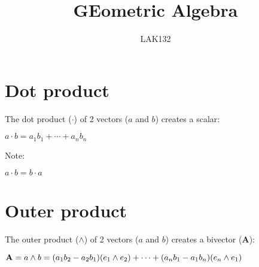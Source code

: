 \documentclass[14pt]{extarticle}
\title{GEometric Algebra}
\author{LAK132}
\begin{document}
\color{white}
\pagecolor{black!90}

\setlength{\parindent}{0pt}
\setlength{\parskip}{6pt}

\maketitle

\pagebreak
\tableofcontents

%
%

\pagebreak
\section{Dot product}
\label{sec:dot-product}

The dot product (\(\cdot\)) of 2 vectors (\(a\) and \(b\))
creates a scalar:

\newcommand{\dotpart}[4]{ #1_#2 #3_#4 }

\newcommand{\expdot}[3][]{
  #1 \dotpart{#2}{1}{#3}{1} + \cdots + #1 \dotpart{#2}{n}{#3}{n}}

\( a \cdot b = \expdot{a}{b} \)

Note:

\( a \cdot b = b \cdot a \)

%
%

\pagebreak
\section{Outer product}
\label{sec:outer-product}

The outer product (\(\wedge\)) of 2 vectors (\(a\) and \(b\))
creates a bivector (\(\mathbf{A}\)):

\newcommand{\wedgepart}[4]{(#1_#2 #3_#4 - #1_#4 #3_#2) (e_#2 \wedge e_#4)}

\newcommand{\expwedge}[2]{
  \wedgepart{#1}{1}{#2}{2} + \cdots + \wedgepart{#1}{n}{#2}{1}}

\newcommand{\expwedgepre}[3]{
  #1 \wedgepart{#2}{1}{#3}{2} + \cdots + #1 \wedgepart{#2}{n}{#3}{1}}

\newcommand{\expwedgepost}[3]{
  \wedgepart{#1}{1}{#2}{2} #3 + \cdots + \wedgepart{#1}{n}{#2}{1} #3}

\newcommand{\expwedgeprepost}[4]{
  #1 \wedgepart{#2}{1}{#3}{2} #4 + \cdots + #1 \wedgepart{#2}{n}{#3}{1} #4}

\(
  \mathbf{A}
  = a \wedge b \\
  = \expwedge{a}{b}
\)
\end{document}
